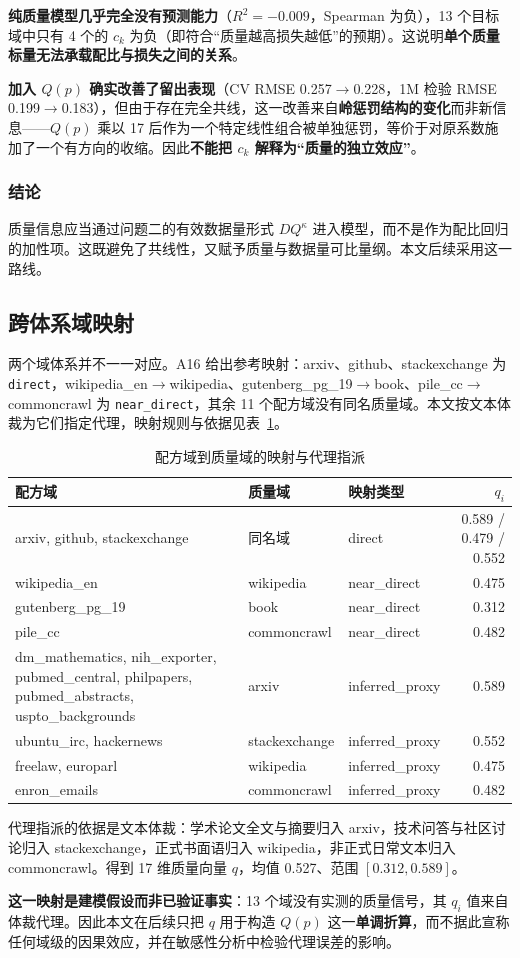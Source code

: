 \textbf{纯质量模型几乎完全没有预测能力}（$R^2=-0.009$，Spearman 为负），13 个目标域中只有 4 个的 $c_k$ 为负（即符合``质量越高损失越低''的预期）。这说明\textbf{单个质量标量无法承载配比与损失之间的关系}。

\textbf{加入 $Q(p)$ 确实改善了留出表现}（CV RMSE 0.257$\to$0.228，1M 检验 RMSE 0.199$\to$0.183），但由于存在完全共线，这一改善来自\textbf{岭惩罚结构的变化}而非新信息——$Q(p)$ 乘以 17 后作为一个特定线性组合被单独惩罚，等价于对原系数施加了一个有方向的收缩。因此\textbf{不能把 $c_k$ 解释为``质量的独立效应''}。

\subsubsection{结论}

质量信息应当通过问题二的有效数据量形式 $DQ^{\kappa}$ 进入模型，而不是作为配比回归的加性项。这既避免了共线性，又赋予质量与数据量可比量纲。本文后续采用这一路线。

\subsection{跨体系域映射}

两个域体系并不一一对应。A16 给出参考映射：arxiv、github、stackexchange 为 \texttt{direct}，wikipedia\_en$\to$wikipedia、gutenberg\_pg\_19$\to$book、pile\_cc$\to$commoncrawl 为 \texttt{near\_direct}，其余 11 个配方域没有同名质量域。本文按文本体裁为它们指定代理，映射规则与依据见表~\ref{tab:q1_map}。

\begin{table}[htbp]
\centering
\caption{配方域到质量域的映射与代理指派}
\label{tab:q1_map}
\small
\begin{tabular}{l|l|l|r}
\toprule
\textbf{配方域} & \textbf{质量域} & \textbf{映射类型} & \textbf{$q_i$} \\
\midrule
arxiv, github, stackexchange & 同名域 & direct & 0.589 / 0.479 / 0.552 \\
wikipedia\_en & wikipedia & near\_direct & 0.475 \\
gutenberg\_pg\_19 & book & near\_direct & 0.312 \\
pile\_cc & commoncrawl & near\_direct & 0.482 \\
dm\_mathematics, nih\_exporter, pubmed\_central, philpapers, pubmed\_abstracts, uspto\_backgrounds & arxiv & inferred\_proxy & 0.589 \\
ubuntu\_irc, hackernews & stackexchange & inferred\_proxy & 0.552 \\
freelaw, europarl & wikipedia & inferred\_proxy & 0.475 \\
enron\_emails & commoncrawl & inferred\_proxy & 0.482 \\
\bottomrule
\end{tabular}
\end{table}

代理指派的依据是文本体裁：学术论文全文与摘要归入 arxiv，技术问答与社区讨论归入 stackexchange，正式书面语归入 wikipedia，非正式日常文本归入 commoncrawl。得到 17 维质量向量 $q$，均值 0.527、范围 $[0.312,0.589]$。

\textbf{这一映射是建模假设而非已验证事实}：13 个域没有实测的质量信号，其 $q_i$ 值来自体裁代理。因此本文在后续只把 $q$ 用于构造 $Q(p)$ 这一\textbf{单调折算}，而不据此宣称任何域级的因果效应，并在敏感性分析中检验代理误差的影响。
